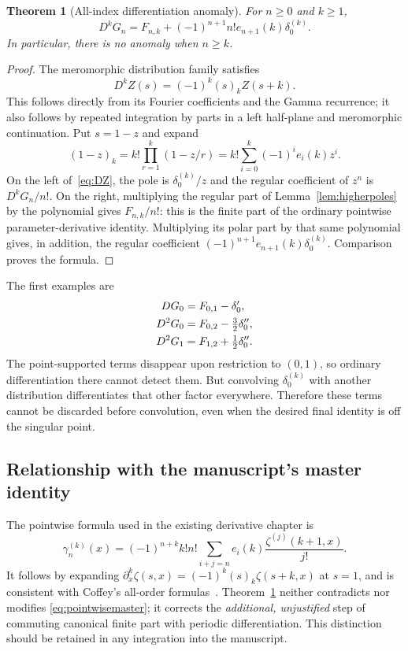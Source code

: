 \documentclass[11pt]{article}
\numberwithin{equation}{section}
\newtheorem{theorem}{Theorem}[section]
\theoremstyle{definition}
\theoremstyle{remark}
\begin{document}
\begin{theorem}[All-index differentiation anomaly]\label{thm:anomaly}
For $n\ge0$ and $k\ge1$,
\begin{equation}\label{eq:anomaly}
 D^kG_n=F_{n,k}+(-1)^{n+1}n!e_{n+1}(k)\delta_0^{(k)}.
\end{equation}
In particular, there is no anomaly when $n\ge k$.
\end{theorem}
\begin{proof}
The meromorphic distribution family satisfies
\begin{equation}\label{eq:DZ}
 D^kZ(s)=(-1)^k(s)_kZ(s+k).
\end{equation}
This follows directly from its Fourier coefficients and the Gamma
recurrence; it also follows by repeated integration by parts in a
left half-plane and meromorphic continuation. Put $s=1-z$ and expand
\[
 (1-z)_k=k!\prod_{r=1}^k(1-z/r)
        =k!\sum_{i=0}^k(-1)^ie_i(k)z^i.
\]
On the left of~\eqref{eq:DZ}, the pole is $\delta_0^{(k)}/z$ and the
regular coefficient of $z^n$ is $D^kG_n/n!$. On the right, multiplying
the regular part of Lemma~\ref{lem:higherpoles} by the polynomial gives
$F_{n,k}/n!$: this is the finite part of the ordinary pointwise
parameter-derivative identity. Multiplying its polar part by that same
polynomial gives, in addition, the regular coefficient
$(-1)^{n+1}e_{n+1}(k)\delta_0^{(k)}$. Comparison proves the formula.
\end{proof}

The first examples are
\begin{align}
 DG_0&=F_{0,1}-\delta_0',\label{eq:anomalylow}\\
 D^2G_0&=F_{0,2}-\tfrac32\delta_0'',\notag\\
 D^2G_1&=F_{1,2}+\tfrac12\delta_0''.\notag
\end{align}
The point-supported terms disappear upon restriction to $(0,1)$, so
ordinary differentiation there cannot detect them. But convolving
$\delta_0^{(k)}$ with another distribution differentiates that other
factor everywhere. Therefore these terms cannot be discarded before
convolution, even when the desired final identity is off the singular
point.

\subsection{Relationship with the manuscript's master identity}
The pointwise formula used in the existing derivative chapter is
\begin{equation}\label{eq:pointwisemaster}
 \gamma_n^{(k)}(x)
 =(-1)^{n+k}k!n!\sum_{i+j=n}e_i(k)
              \frac{\zeta^{(j)}(k+1,x)}{j!}.
\end{equation}
It follows by expanding
$\partial_x^k\zeta(s,x)=(-1)^k(s)_k\zeta(s+k,x)$ at $s=1$,
and is consistent with Coffey's all-order formulas~\cite{Coffey}.
Theorem~\ref{thm:anomaly} neither contradicts nor modifies
\eqref{eq:pointwisemaster}; it corrects the \emph{additional, unjustified}
step of commuting canonical finite part with periodic differentiation.
This distinction should be retained in any integration into the manuscript.
\end{document}
